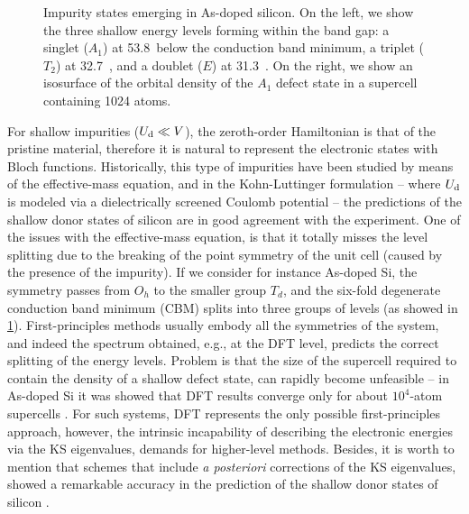 \begin{figure}
    \centering
    \caption[Impurity states in As-doped silicon]{Impurity states emerging in As-doped silicon. On the left, we show the three shallow energy levels forming within the band gap: a singlet ($A_1$) at 53.8~\mev below the conduction band minimum, a triplet ($T_2$) at 32.7~\mev, and a doublet ($E$) at 31.3~\mev. On the right, we show an isosurface of the orbital density of the $A_1$ defect state in a supercell containing 1024 atoms.}
    \label{fig:as-si-defect}
\end{figure}

For shallow impurities ($U_{\rm d} \ll V$), the zeroth-order Hamiltonian is that of the pristine material, therefore it is natural to represent the electronic states with Bloch functions. Historically, this type of impurities have been studied by means of the effective-mass equation, and in the Kohn-Luttinger formulation \cite{kohn_theory_1955} -- where $U_{\rm d}$ is modeled via a dielectrically screened Coulomb potential -- the predictions of the shallow donor states of silicon are in good agreement with the experiment. One of the issues with the effective-mass equation, is that it totally misses the level splitting due to the breaking of the point symmetry of the unit cell (caused by the presence of the impurity). If we consider for instance As-doped Si, the symmetry passes from $O_h$ to the smaller group $T_d$, and the six-fold degenerate conduction band minimum (CBM) splits into three groups of levels (as showed in \cref{fig:as-si-defect}). First-principles methods usually embody all the symmetries of the system, and indeed the spectrum obtained, e.g., at the DFT level, predicts the correct splitting of the energy levels. Problem is that the size of the supercell required to contain the density of a shallow defect state, can rapidly become unfeasible -- in As-doped Si it was showed that DFT results converge only for about $10^4$-atom supercells \cite{yamamoto_first-principles_2009}. For such systems, DFT represents the only possible first-principles approach, however, the intrinsic incapability of describing the electronic energies via the KS eigenvalues, demands for higher-level methods. Besides, it is worth to mention that schemes that include \emph{a posteriori} corrections of the KS eigenvalues, showed a remarkable accuracy in the prediction of the shallow donor states of silicon \cite{yamamoto_first-principles_2009,smith_ab_2017}.

